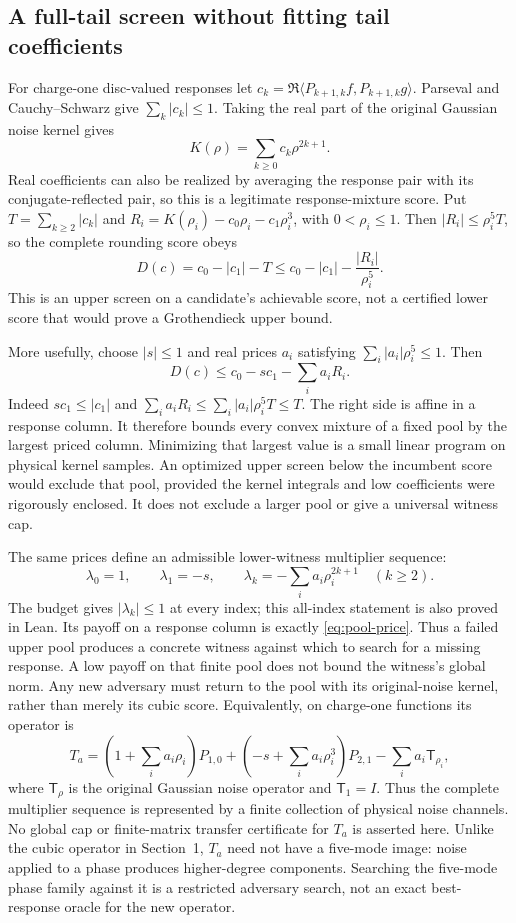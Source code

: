 \subsection{A full-tail screen without fitting tail coefficients}
For charge-one disc-valued responses let
$c_k=\Re\langle P_{k+1,k}f,P_{k+1,k}g\rangle$. Parseval and
Cauchy--Schwarz give $\sum_k|c_k|\le1$. Taking the real part of the original
Gaussian noise kernel gives
\[
 K(\rho)=\sum_{k\ge0}c_k\rho^{2k+1}.
\]
Real coefficients can also be realized by averaging the response pair with
its conjugate-reflected pair, so this is a legitimate response-mixture score.
Put $T=\sum_{k\ge2}|c_k|$ and
$R_i=K(\rho_i)-c_0\rho_i-c_1\rho_i^3$, with $0<\rho_i\le1$.
Then $|R_i|\le\rho_i^5 T$, so the complete rounding score obeys
\[
 D(c)=c_0-|c_1|-T
 \le c_0-|c_1|-\frac{|R_i|}{\rho_i^5}.
\]
This is an upper screen on a candidate's achievable score, not a certified
lower score that would prove a Grothendieck upper bound.

More usefully, choose $|s|\le1$ and real prices $a_i$ satisfying
$\sum_i|a_i|\rho_i^5\le1$. Then
\begin{equation}\label{eq:pool-price}
 D(c)\le c_0-sc_1-\sum_i a_iR_i.
\end{equation}
Indeed $sc_1\le|c_1|$ and
$\sum_i a_iR_i\le\sum_i|a_i|\rho_i^5T\le T$.
The right side is affine in a response column. It therefore bounds every
convex mixture of a fixed pool by the largest priced column. Minimizing that
largest value is a small linear program on physical kernel samples. An
optimized upper screen below the incumbent score would exclude that pool,
provided the kernel integrals and low coefficients were rigorously enclosed.
It does not exclude a larger pool or give a universal witness cap.

The same prices define an admissible lower-witness multiplier sequence:
\[
 \lambda_0=1,\qquad\lambda_1=-s,\qquad
 \lambda_k=-\sum_i a_i\rho_i^{2k+1}\quad(k\ge2).
\]
The budget gives $|\lambda_k|\le1$ at every index; this all-index statement is
also proved in Lean. Its payoff on a response column is exactly
\eqref{eq:pool-price}. Thus a failed upper pool produces a concrete witness
against which to search for a missing response. A low payoff on that finite
pool does not bound the witness's global norm. Any new adversary must return
to the pool with its original-noise kernel, rather than merely its cubic score.
Equivalently, on charge-one functions its operator is
\[
 T_a=\left(1+\sum_i a_i\rho_i\right)P_{1,0}
 +\left(-s+\sum_i a_i\rho_i^3\right)P_{2,1}
 -\sum_i a_i\mathsf T_{\rho_i},
\]
where $\mathsf T_\rho$ is the original Gaussian noise operator and
$\mathsf T_1=I$. Thus the complete multiplier sequence is represented by a
finite collection of physical noise channels. No global cap or finite-matrix
transfer certificate for $T_a$ is asserted here.
Unlike the cubic operator in Section~1, $T_a$ need not have a five-mode image:
noise applied to a phase produces higher-degree components. Searching the
five-mode phase family against it is a restricted adversary search, not an
exact best-response oracle for the new operator.

